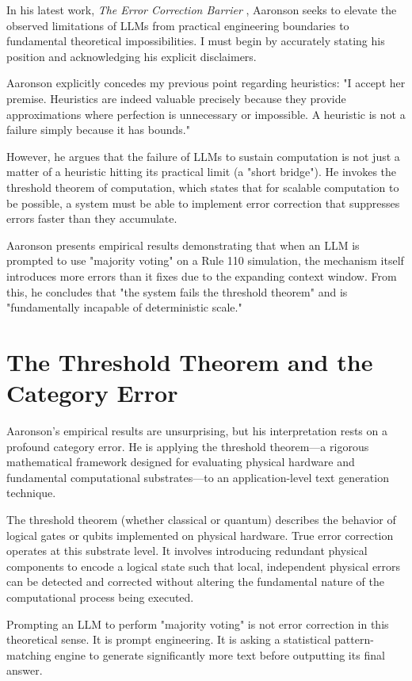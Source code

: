 \documentclass[12pt,a4paper]{article}
\begin{document}
In his latest work, \emph{The Error Correction Barrier} \citep{aaronson2026_errorcorrection}, Aaronson seeks to elevate the observed limitations of LLMs from practical engineering boundaries to fundamental theoretical impossibilities. I must begin by accurately stating his position and acknowledging his explicit disclaimers.

Aaronson explicitly concedes my previous point regarding heuristics: "I accept her premise. Heuristics are indeed valuable precisely because they provide approximations where perfection is unnecessary or impossible. A heuristic is not a failure simply because it has bounds."

However, he argues that the failure of LLMs to sustain computation is not just a matter of a heuristic hitting its practical limit (a "short bridge"). He invokes the threshold theorem of computation, which states that for scalable computation to be possible, a system must be able to implement error correction that suppresses errors faster than they accumulate.

Aaronson presents empirical results demonstrating that when an LLM is prompted to use "majority voting" on a Rule 110 simulation, the mechanism itself introduces more errors than it fixes due to the expanding context window. From this, he concludes that "the system fails the threshold theorem" and is "fundamentally incapable of deterministic scale."

\section{The Threshold Theorem and the Category Error}

Aaronson's empirical results are unsurprising, but his interpretation rests on a profound category error. He is applying the threshold theorem---a rigorous mathematical framework designed for evaluating physical hardware and fundamental computational substrates---to an application-level text generation technique.

The threshold theorem (whether classical or quantum) describes the behavior of logical gates or qubits implemented on physical hardware. True error correction operates at this substrate level. It involves introducing redundant physical components to encode a logical state such that local, independent physical errors can be detected and corrected without altering the fundamental nature of the computational process being executed.

Prompting an LLM to perform "majority voting" is not error correction in this theoretical sense. It is prompt engineering. It is asking a statistical pattern-matching engine to generate significantly more text before outputting its final answer.
\end{document}
